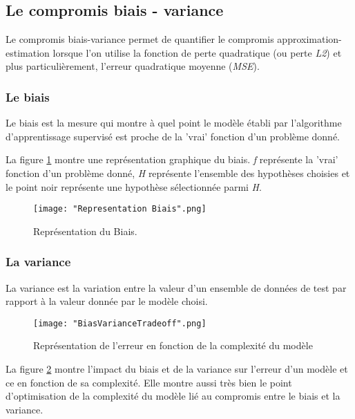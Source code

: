 \documentclass[a4paper]{article}
\begin{document}
\newpage

\subsection{Le compromis biais - variance}

Le compromis biais-variance permet de quantifier le compromis approximation-estimation lorsque l'on utilise la fonction de perte quadratique (ou perte \textit{L2}) et plus particulièrement, l'erreur quadratique moyenne (\textit{MSE}).

\subsubsection{Le biais}
Le biais est la mesure qui montre à quel point le modèle établi par l'algorithme d'apprentissage supervisé est proche de la 'vrai' fonction d'un problème donné. \newline

La figure \ref{BiasRepresentation} montre une représentation graphique du biais. \textit{f} représente la 'vrai' fonction d'un problème donné, \textit{H} représente l'ensemble des hypothèses choisies et le point noir représente une hypothèse sélectionnée parmi \textit{H}. \newline

\begin{figure}[!h]
	\centering
	\texttt{[image: "Representation Biais".png]}
	\caption{Représentation du Biais.}
	\cite{BiasVarianceTradeoffTextbooksUpdate}
	\label{BiasRepresentation}
\end{figure}

\subsubsection{La variance}

La variance est la variation entre la valeur d'un ensemble de données de test par rapport à la valeur donnée par le modèle choisi. 

\newpage

\begin{figure}[!h]
	\centering
	\texttt{[image: "BiasVarianceTradeoff".png]}
	\caption{Représentation de l'erreur en fonction de la complexité du modèle}
	\cite{BiasVarianceTradeoffTextbooksUpdate}
	\label{TradeoffRepresentation}
\end{figure}

La figure \ref{TradeoffRepresentation} montre l'impact du biais et de la variance sur l'erreur d'un modèle et ce en fonction de sa complexité. Elle montre aussi très bien le point d'optimisation de la complexité du modèle lié au compromis entre le biais et la variance.
\end{document}
